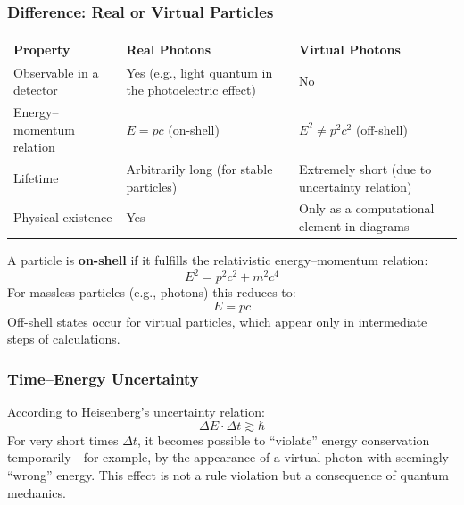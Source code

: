 \subsubsection*{Difference: Real or Virtual Particles}
\begin{table}[H]
	\centering
	\scriptsize 
	
	{\small
		\begin{center}
			\renewcommand{\arraystretch}{1.3}
			\begin{tabular}{|p{3cm}|p{3.0cm}|p{3.0cm}|}
				\hline
				\textbf{Property} & \textbf{Real Photons} & \textbf{Virtual Photons} \\
				\hline
				Observable in a detector & Yes (e.g., light quantum in the photoelectric effect) & No \\
				\hline
				Energy–momentum relation & $E = pc$ (on-shell) & $E^2 \ne p^2 c^2$ (off-shell) \\
				\hline
				Lifetime & Arbitrarily long (for stable particles) & Extremely short (due to uncertainty relation) \\
				\hline
				Physical existence & Yes & Only as a computational element in diagrams \\
				\hline
			\end{tabular}
		\end{center}
	}
\end{table}
\vspace{1em}

\begin{tcolorbox}[hinweisbox, title=On-Shell Condition]
	\label{box:On-shell-Bedingung}
	A particle is \textbf{on-shell} if it fulfills the relativistic energy–momentum relation:
	\[
	E^2 = p^2 c^2 + m^2 c^4
	\]
	For massless particles (e.g., photons) this reduces to:
	\[
	E = pc
	\]
	Off-shell states occur for virtual particles, which appear only in intermediate steps of calculations.
\end{tcolorbox}

\subsubsection*{Time–Energy Uncertainty}
According to Heisenberg’s uncertainty relation:
\[
\Delta E \cdot \Delta t \gtrsim \hbar
\]\index{$\hbar$}
For very short times $\Delta t$, it becomes possible to “violate” energy conservation temporarily—for example, by the appearance of a virtual photon with seemingly “wrong” energy.
This effect is not a rule violation but a consequence of quantum mechanics.

